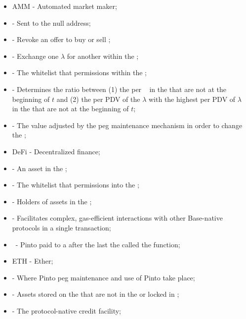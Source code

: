 \documentclass[class=article, crop=false]{standalone}
\begin{document}
\begin{itemize}[topsep=0pt, itemsep=3pt,leftmargin=16pt]
    \item[] AMM - Automated market maker;
    \item[]  - Sent to the null address;
    \item[]  - Revoke an offer to buy or sell ;
    \item[]  - Exchange one  $\lambda$ for another within the ;
    \item[]  - The whitelist that permissions  within the ;
    \item[]  - Determines the ratio between (1) the  per \Pinto\  in the  that are not  at the beginning of $t$ and (2) the  per PDV of the $\lambda$ with the highest  per PDV of $\lambda$  in the  that are not  at the beginning of $t$;
    \item[]  - The value adjusted by the peg maintenance mechanism in order to change the ;    
    \item[] DeFi - Decentralized finance;
    \item[]  - An asset in the ;
    \item[]  - The whitelist that permissions  into the ;
    \item[]  - Holders of  assets in the ;
    \item[]  - Facilitates complex, gas-efficient interactions with other Base-native protocols in a single transaction;
    \item[]  \Pinto\ - Pinto paid to a  after the last  the  called the  function;
    \item[] ETH - Ether;
    \item[]  - Where Pinto peg maintenance and use of Pinto take place;
    \item[]  - Assets stored on the  that are not  in the  or locked in ;
    \item[]  - The protocol-native credit facility;

\end{itemize}
\end{document}
